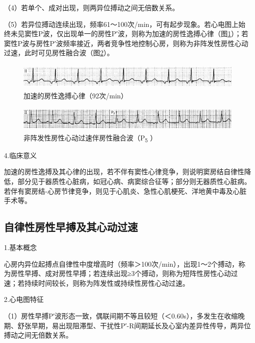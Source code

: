 （4）若单个、成对出现，则两异位搏动之间无倍数关系。

（5）若异位搏动连续出现，频率61～100次/min，可有起步现象。若心电图上始终未见窦性P波，仅出现单一的房性P′波，则称为加速的房性逸搏心律（图\ref{fig15-1}）；若窦性P波与房性P′波频率接近，两者竞争性地控制心房，则称为非阵发性房性心动过速，此时可见房性融合波（图\ref{fig15-2}）。

\begin{figure}[!htbp]
 \centering
 \includegraphics[width=5.58333in,height=0.51042in]{./images/Image00267.jpg}
 \captionsetup{justification=centering}
 \caption{加速的房性逸搏心律（92次/min）}
 \label{fig15-1}
  \end{figure} 

\begin{figure}[!htbp]
 \centering
 \includegraphics[width=5.58333in,height=0.5in]{./images/Image00268.jpg}
 \captionsetup{justification=centering}
 \caption{非阵发性房性心动过速伴房性融合波（P\textsubscript{5} ）}
 \label{fig15-2}
  \end{figure} 

4.临床意义

加速的房性逸搏及其心律的出现，若不伴有窦性心律竞争，则说明窦房结自律性降低，部分见于器质性心脏病，如冠心病、病窦综合征等；部分则无器质性心脏病。若伴有窦房结-心房节律竞争，则见于心肌炎、急性心肌梗死、洋地黄中毒及心脏手术等。

\protect\hypertarget{text00022.htmlux5cux23subid264}{}{}

\subsection{自律性房性早搏及其心动过速}

1.基本概念

心房内异位起搏点自律性中度增高时（频率＞100次/min），出现1～2个搏动，称为房性早搏、成对房性早搏；若连续出现≥3个搏动，则称为短阵性房性心动过速；若持续时间较长，则称为阵发性或持续性房性心动过速。

2.心电图特征

（1）房性早搏P′波形态一致，偶联间期不等且较短（＜0.60s），多发生在收缩晚期、舒张早期，易出现阻滞型、干扰性P′-R间期延长及心室内差异性传导，两异位搏动之间无倍数关系。

